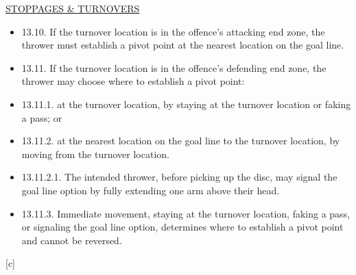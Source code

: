 \underline{\uppercase{stoppages \& turnovers}}
\begin{itemize}
    \tiny
    \item 13.10. If the turnover location is in the offence’s attacking end zone, the thrower must establish a pivot point at the nearest location on the goal line.
    \item 13.11. If the turnover location is in the offence’s defending end zone, the thrower may choose where to establish a pivot point:
    \item 13.11.1. at the turnover location, by staying at the turnover location or faking a pass; or
    \item 13.11.2. at the nearest location on the goal line to the turnover location, by moving from the turnover location.
    \item 13.11.2.1. The intended thrower, before picking up the disc, may signal the goal line option by fully extending one arm above their head.
    \item 13.11.3. Immediate movement, staying at the turnover location, faking a pass, or signaling the goal line option, determines where to establish a pivot point and cannot be reversed.
\end{itemize}
\begin{center}[c]\end{center}
